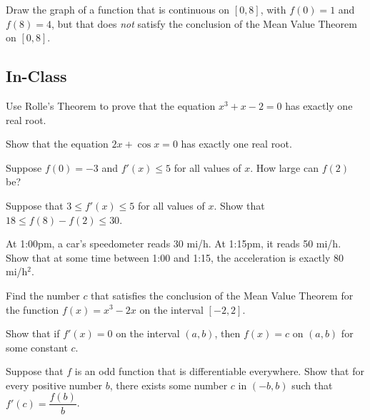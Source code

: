 \documentclass[notes]{subfiles}
\begin{document}
		\begin{ex}
			Draw the graph of a function that is continuous on $[0,8]$, with $f(0) = 1$ and $f(8) = 4$, but that does \emph{not} satisfy the conclusion of the Mean Value Theorem on $[0,8]$.
		\end{ex}
			\newpage
			
	\subsection*{In-Class}		
		\begin{ex}
			Use Rolle's Theorem to prove that the equation $x^3 + x -2 = 0$ has exactly one real root.
		\end{ex}
			\newpage
			
		\begin{ex}
			Show that the equation $2x + \cos x = 0$ has exactly one real root.
		\end{ex}
			
		\begin{ex}
			Suppose $f(0) = -3$ and $f'(x)\leq 5$ for all values of $x$.  How large can $f(2)$ be?
		\end{ex}
			\newpage
			
		\begin{ex}
			Suppose that $3\leq f'(x)\leq 5$ for all values of $x$.  Show that $18\leq f(8)-f(2)\leq 30$.
		\end{ex}
		
		
		\begin{ex}
			At 1:00pm, a car's speedometer reads 30 mi/h.  At 1:15pm, it reads 50 mi/h.  Show that at some time between 1:00 and 1:15, the acceleration is exactly 80 mi/h$^2$.
		\end{ex}
		
		\begin{ex}
			Find the number $c$ that satisfies the conclusion of the Mean Value Theorem for the function $f(x) = x^3-2x$ on the interval $[-2,2]$.
		\end{ex}
			\newpage
			
		\begin{ex}
			Show that if $f'(x) = 0$ on the interval $(a,b)$, then $f(x) = c$ on $(a,b)$ for some constant $c$.
		\end{ex}
		
		\begin{ex}
			Suppose that $f$ is an odd function that is differentiable everywhere.  Show that for every positive number $b$, there exists some number $c$ in $(-b,b)$ such that $f'(c) = \dfrac{f(b)}{b}$.
		\end{ex}	
			\newpage
			
\end{document}
